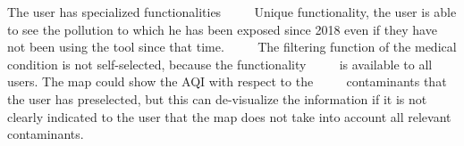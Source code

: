      


\begin{itemize}
  \done The user has specialized functionalities
     \done Unique functionality, the user is able to see the pollution to which he has been exposed since 2018 even if they have not been using the tool since that time.
     \crossed The filtering function of the medical condition is not self-selected, because the functionality
     is available to all users. The map could show the AQI with respect to the
     contaminants that the user has preselected, but this can de-visualize the information if it is not
     clearly indicated to the user that the map does not take into account all relevant contaminants.
\end{itemize}
 \newpage